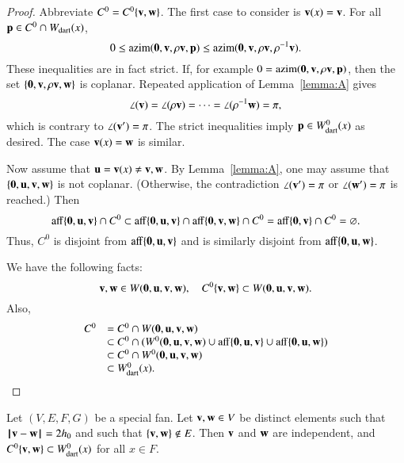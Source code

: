 \begin{proof}  Abbreviate $C^0 = C^0\{\v,\w\}$.  The first case to consider is $\v(x)=\v$.  For all $\p\in C^0\cap \bWdart(x)$, 
$$
0 \le \op{azim}(\orz,\v,\rho \v,\p) \le \op{azim}(\orz,\v,\rho \v,\rho^{-1} \v).
$$  
These inequalities are in fact strict.  If, for example $0 = \op{azim}(\orz,\v,\rho \v,\p)$, then
the set $\{\orz,\v,\rho \v,\w\}$ is coplanar.  Repeated application of Lemma~\ref{lemma:A} gives
$$
\angle(\v) = \angle(\rho \v) = \cdots = \angle(\rho^{-1} \w) = \pi,
$$
which is contrary to $\angle(\v') = \pi$.  
The strict inequalities imply $\p\in \Wdart(x)$ as desired.  The case $\v(x)=\w$ is similar.

Now assume that $\u=\v(x)\ne \v,\w$.  
By Lemma~\ref{lemma:A},  one may assume that $\{\orz,\u,\v,\w\}$ is not coplanar. 
(Otherwise, the contradiction $\angle(\v')=\pi$ or $\angle(\w')=\pi$ is reached.) Then
$$
\op{aff}\{\orz,\u,\v\}\cap C^0 \subset \op{aff}\{\orz,\u,\v\}\cap \op{aff}\{\orz,\v,\w\} \cap C^0 = \op{aff}\{\orz,\v\} \cap C^0 = \emptyset.
$$
Thus, $C^0$ is disjoint from $\op{aff}\{\orz,\u,\v\}$ and is similarly disjoint from $\op{aff}\{\orz,\u,\w\}$.  

We have the following facts:
$$
\v,\w\in W(\orz,\u,\v,\w),\quad C^0\{\v,\w\} \subset W(\orz,\u,\v,\w).
$$
Also,
$$
\begin{array}{rll}
C^0 &= C^0\cap W(\orz,\u,\v,\w) \\
     &\subset C^0 \cap (W^0(\orz,\u,\v,\w) \cup \op{aff}\{\orz,\u,\v\} \cup \op{aff}\{\orz,\u,\w\})\\
     &\subset C^0 \cap W^0(\orz,\u,\v,\w)\\
     &\subset \Wdart(x).
\end{array}
$$
\end{proof}

\begin{lemma}\label{lemma:2hm-slice}
Let $(V,E,F,G)$ be a special fan.  Let $\v,\w\in V$ be distinct elements such that $\norm{\v}{\w}=2\hm$ and such that $\{\v,\w\}\not\in E$.
Then $\v$ and $\w$ are independent, 
and $C^0\{\v,\w\}\subset \Wdart(x)$ for all $x\in F$.
\end{lemma}

